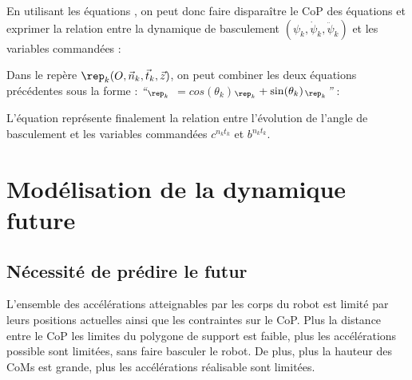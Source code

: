 				En utilisant les équations  , on peut donc faire disparaître le CoP des équations  et exprimer la relation entre la dynamique de basculement $(\psi_k, \dot{\psi}_k, \ddot{\psi}_k)$ et les variables commandées :
				
				Dans le repère $\rep_k(O, \vec{n}_k, \vec{t}_k, \vec{z})$, on peut combiner les deux équations précédentes  sous la forme :
				\textit{``$_{\rep_k}$ $=cos(\theta_k)$$_{\rep_k}+\sin(\theta_k)$$_{\rep_k}$''} : 
				
				L'équation  représente finalement la relation entre l'évolution de l'angle de basculement et les variables commandées  $c^{n_kt_k}$ et $b^{n_kt_k}$.

	\section{Modélisation de la dynamique future}
		\label{section.modele_futur}
		\subsection{Nécessité de prédire le futur}
	
			L'ensemble des accélérations atteignables par les corps du robot est limité par leurs positions actuelles ainsi que les contraintes sur le CoP. 
			Plus la distance entre le CoP les limites du polygone de support est faible, plus les accélérations possible sont limitées, sans faire basculer le robot.
			De plus, plus la hauteur des CoMs est grande, plus les accélérations réalisable sont limitées.
			

